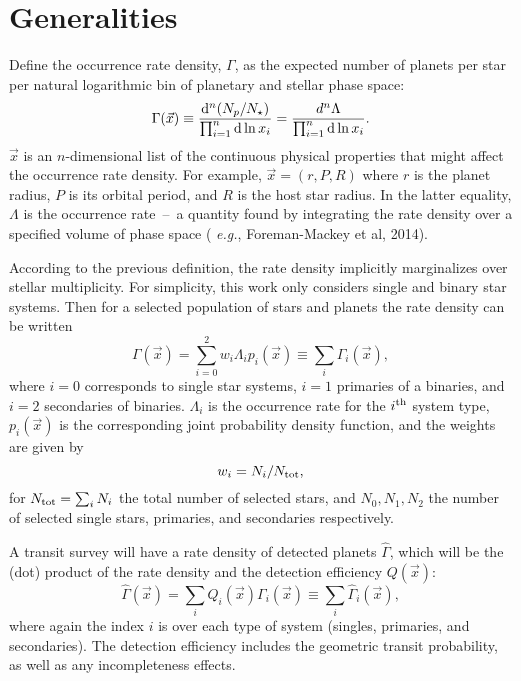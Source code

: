 \section*{Generalities}

Define the occurrence rate density, $\Gamma$,
as the expected number of planets per star per natural logarithmic bin 
of planetary and stellar phase space:
\begin{equation}
\Gamma(\vec{x}) \equiv \frac{{\rm d}^n(N_p/N_\star)}{\prod_{i=1}^{n} {\rm d} 
\ln x_i}
= \frac{d^n\Lambda}{\prod_{i=1}^{n} {\rm d} \ln x_i  }.
\end{equation}
$\vec{x}$ is an $n$-dimensional list of the continuous physical properties 
that might affect the occurrence rate density. For example,
$\vec{x}=(r,P,R)$ where $r$ is the planet radius, $P$ is its orbital period, 
and $R$ is the host star radius.
In the latter equality, $\Lambda$ is the occurrence rate~--~a quantity found 
by integrating the rate density over a specified volume of phase space ({\it 
e.g.}, Foreman-Mackey et al, 2014).

According to the previous definition, the rate density implicitly marginalizes 
over stellar multiplicity.
For simplicity, this work only considers single and binary star systems.
Then for a selected population of stars and planets the rate density can be 
written
\begin{equation}
\Gamma(\vec{x}) = \sum_{i=0}^{2} w_i \Lambda_i p_i(\vec{x}) \equiv \sum_i 
\Gamma_i(\vec{x}),
\end{equation}
where $i=0$ corresponds to single star systems, $i=1$ primaries of a binaries, 
and $i=2$ secondaries of binaries.
$\Lambda_i$ is the occurrence rate for the $i^{\rm th}$ system 
type, $p_i(\vec{x})$ is the corresponding joint probability density function, 
and the weights are given by 
\begin{equation}
w_i = N_i/N_{\rm tot},
\end{equation}
for $N_{\rm tot} = \sum_i N_i$ the total number of selected stars, and 
$N_0,N_1,N_2$ the number of selected single stars, primaries, and 
secondaries respectively.

A transit survey will have a rate density of detected planets $\hat{\Gamma}$, 
which will be the (dot) product of the rate density and the detection 
efficiency $Q(\vec{x})$:
\begin{equation}
\hat{\Gamma}(\vec{x}) = \sum_i Q_i(\vec{x}) \Gamma_i(\vec{x}) 
\equiv \sum_i \hat{\Gamma}_i(\vec{x}),
\label{eq:detected_rate_density}
\end{equation}
where again the index $i$ is over each type of system (singles, primaries, 
and secondaries).
The detection efficiency includes the geometric transit probability, as well 
as any incompleteness effects.




